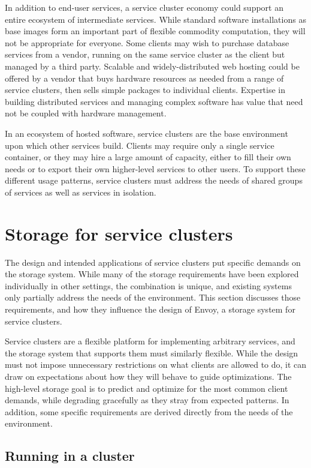 In addition to end-user services, a service cluster economy could support an entire ecosystem of intermediate services. While standard software installations as base images form an important part of flexible commodity computation, they will not be appropriate for everyone. Some clients may wish to purchase database services from a vendor, running on the same service cluster as the client but managed by a third party. Scalable and widely-distributed web hosting could be offered by a vendor that buys hardware resources as needed from a range of service clusters, then sells simple packages to individual clients. Expertise in building distributed services and managing complex software has value that need not be coupled with hardware management.

In an ecosystem of hosted software, service clusters are the base environment upon which other services build. Clients may require only a single service container, or they may hire a large amount of capacity, either to fill their own needs or to export their own higher-level services to other users. To support these different usage patterns, service clusters must address the needs of shared groups of services as well as services in isolation.

\section{Storage for service clusters}

The design and intended applications of service clusters put specific demands on the storage system. While many of the storage requirements have been explored individually in other settings, the combination is unique, and existing systems only partially address the needs of the environment. This section discusses those requirements, and how they influence the design of Envoy, a storage system for service clusters.

Service clusters are a flexible platform for implementing arbitrary services, and the storage system that supports them must similarly flexible. While the design must not impose unnecessary restrictions on what clients are allowed to do, it can draw on expectations about how they will behave to guide optimizations. The high-level storage goal is to predict and optimize for the most common client demands, while degrading gracefully as they stray from expected patterns. In addition, some specific requirements are derived directly from the needs of the environment.

\subsection{Running in a cluster}

